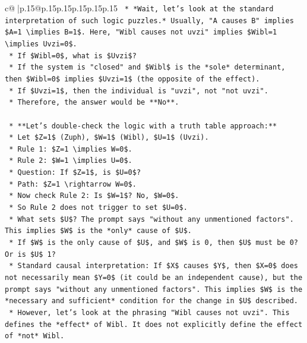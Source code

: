 \documentclass{article}
\begin{document}
{\begin{supertabular}{c@{$\;$}|p{.15\linewidth}@{}p{.15\linewidth}p{.15\linewidth}p{.15\linewidth}p{.15\linewidth}p{.15\linewidth}}
{{{\texttt{        *   *Wait, let's look at the standard interpretation of such logic puzzles.* Usually, "A causes B" implies \$A=1 \textbackslash{}implies B=1\$. Here, "Wibl causes not uvzi" implies \$Wibl=1 \textbackslash{}implies Uvzi=0\$.} \\
\texttt{        *   If \$Wibl=0\$, what is \$Uvzi\$?} \\
\texttt{            *   If the system is "closed" and \$Wibl\$ is the *sole* determinant, then \$Wibl=0\$ implies \$Uvzi=1\$ (the opposite of the effect).} \\
\texttt{            *   If \$Uvzi=1\$, then the individual is "uvzi", not "not uvzi".} \\
\texttt{            *   Therefore, the answer would be **No**.} \\
\\ 
\texttt{    *   **Let's double{-}check the logic with a truth table approach:**} \\
\texttt{        *   Let \$Z=1\$ (Zuph), \$W=1\$ (Wibl), \$U=1\$ (Uvzi).} \\
\texttt{        *   Rule 1: \$Z=1 \textbackslash{}implies W=0\$.} \\
\texttt{        *   Rule 2: \$W=1 \textbackslash{}implies U=0\$.} \\
\texttt{        *   Question: If \$Z=1\$, is \$U=0\$?} \\
\texttt{        *   Path: \$Z=1 \textbackslash{}rightarrow W=0\$.} \\
\texttt{        *   Now check Rule 2: Is \$W=1\$? No, \$W=0\$.} \\
\texttt{        *   So Rule 2 does not trigger to set \$U=0\$.} \\
\texttt{        *   What sets \$U\$? The prompt says "without any unmentioned factors". This implies \$W\$ is the *only* cause of \$U\$.} \\
\texttt{        *   If \$W\$ is the only cause of \$U\$, and \$W\$ is 0, then \$U\$ must be 0? Or is \$U\$ 1?} \\
\texttt{        *   Standard causal interpretation: If \$X\$ causes \$Y\$, then \$X=0\$ does not necessarily mean \$Y=0\$ (it could be an independent cause), but the prompt says "without any unmentioned factors". This implies \$W\$ is the *necessary and sufficient* condition for the change in \$U\$ described.} \\
\texttt{        *   However, let's look at the phrasing "Wibl causes not uvzi". This defines the *effect* of Wibl. It does not explicitly define the effect of *not* Wibl.} \\
}}}
\end{supertabular}}
\end{document}
